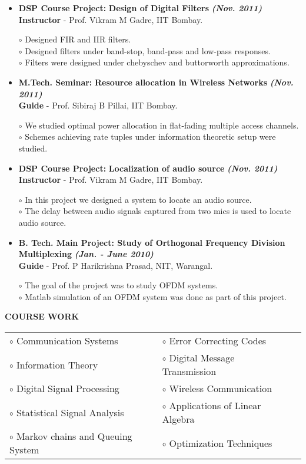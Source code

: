 \documentclass[a4paper,10pt]{article}
\begin{document}
\begin{itemize}
 \item \textbf{DSP Course Project:} \textbf{Design of Digital Filters} \textbf \emph{(Nov. 2011)}\\
	{\textbf{Instructor} - Prof. Vikram M Gadre, IIT Bombay. }
	
	$\circ$ Designed FIR and IIR filters. \\
	$\circ$ Designed filters under band-stop, band-pass and low-pass responses. \\
	$\circ$ Filters were designed under chebyschev and buttorworth approximations.
	
 \item \textbf{M.Tech. Seminar:} \textbf{Resource allocation in Wireless Networks}  \textbf \emph{(Nov. 2011)}\\
        {\textbf{Guide} - Prof. Sibiraj B Pillai, IIT Bombay.   }

      $\circ$ We studied optimal power allocation in flat-fading multiple access channels. \\
      $\circ$ Schemes achieving rate tuples under information theoretic setup were studied.
      
 \item \textbf{DSP Course Project:} \textbf{Localization of audio source} \textbf \emph{(Nov. 2011)}\\
	{\textbf{Instructor} - Prof. Vikram M Gadre, IIT Bombay. }
	
	$\circ$ In this project we designed a system to locate an audio source. \\
	$\circ$ The delay between audio signals captured from two mics is used to locate audio source.

  \item \textbf{{B. Tech. Main Project}: Study of Orthogonal Frequency Division Multiplexing}  \textbf \emph{(Jan. - June 2010)}\\
        {\textbf{Guide} - Prof. P Harikrishna Prasad, NIT, Warangal. }
        
$\circ$ The goal of the project was to study OFDM systems. \\
$\circ$ Matlab simulation of an OFDM system was done as part of this project.

 \end{itemize}

 \colorbox{titleColor}{\parbox{6.5in}{\textbf{COURSE WORK}}}

 \begin{tabular}{p{3.5in}p{5in}p{3.5in}}
     $\circ$ Communication Systems		&$\circ$ Error Correcting Codes \\
    $\circ$ Information Theory			&$\circ$ Digital Message Transmission \\
    $\circ$ Digital Signal Processing		&$\circ$ Wireless Communication \\
    $\circ$ Statistical Signal Analysis	&$\circ$ Applications of Linear Algebra \\
    $\circ$ Markov chains and Queuing System	&$\circ$ Optimization Techniques \\
\end{tabular}
\end{document}
